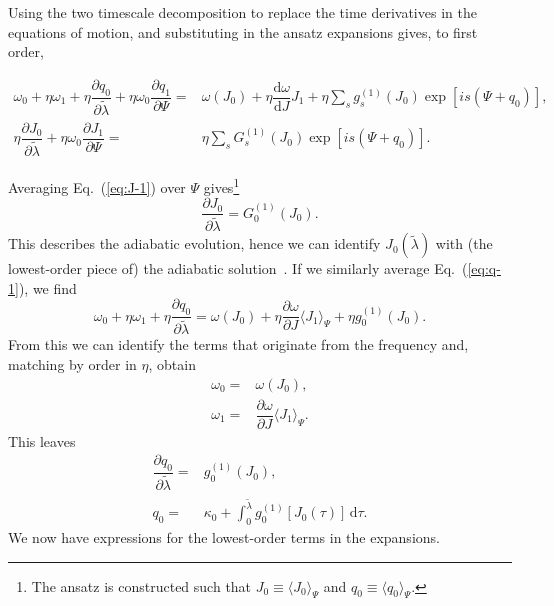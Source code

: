 \documentclass[aps,prd,amsfonts,amssymb,amsmath,nofootinbib,showpacs,superscriptaddress,twocolumn,floatfix]{revtex4-1}
\newcommand{\eqnref}[1]{Eq.~(\ref{eq:#1})}
\newcommand{\dd}{\ensuremath{\mathrm{d}}}
\newcommand{\diff}[2]{\ensuremath{\dfrac{\dd {#1}}{\dd {#2}}}}
\newcommand{\partialdiff}[2]{\ensuremath{\dfrac{\partial {#1}}{\partial {#2}}}}
\newcommand{\intd}[4]{\ensuremath{\int_{#1}^{#2}{#3}\,\dd{#4}}}
\begin{document}
Using the two timescale decomposition to replace the time derivatives in the equations of motion, and substituting in the ansatz expansions gives, to first order,
\begin{widetext}
\begin{subequations}
\begin{align}
\label{eq:q-1}
\omega_0 + \eta\omega_1 + \eta\partialdiff{q_0}{\widetilde{\lambda}} + \eta\omega_0\partialdiff{q_1}{\Psi} = {} & \omega(J_0) + \eta\diff{\omega}{J}J_1 + \eta \sum_s g_s^{(1)}(J_0)\exp\left[is(\Psi + q_0)\right], \\
\eta\partialdiff{J_0}{\widetilde{\lambda}} + \eta\omega_0\partialdiff{J_1}{\Psi} = {} & \eta \sum_s G_s^{(1)}(J_0)\exp\left[is(\Psi + q_0)\right].
\label{eq:J-1}
\end{align}
\end{subequations}
\end{widetext}
Averaging \eqnref{J-1} over $\Psi$ gives\footnote{The ansatz is constructed such that $J_0 \equiv \langle J_0\rangle_\Psi$ and $q_0 \equiv \langle q_0\rangle_\Psi$.}
\begin{equation}
\partialdiff{J_0}{\widetilde{\lambda}} = G_0^{(1)}(J_0).
\label{eq:J-ad}
\end{equation}
This describes the adiabatic evolution, hence we can identify $J_0\left(\widetilde{\lambda}\right)$ with (the lowest-order piece of) the adiabatic solution~\cite{Hinderer2008}. If we similarly average \eqnref{q-1}, we find
\begin{equation}
\omega_0 + \eta\omega_1 +\eta\partialdiff{q_0}{\widetilde{\lambda}} = \omega(J_0) + \eta\partialdiff{\omega}{J}\langle J_1\rangle_\Psi + \eta g_0^{(1)}(J_0).
\end{equation}
From this we can identify the terms that originate from the frequency and, matching by order in $\eta$, obtain
\begin{subequations}
\begin{align}
\omega_0 = {} & \omega(J_0), \\
\omega_1 = {} & \partialdiff{\omega}{J}\langle J_1\rangle_\Psi.
\end{align}
\end{subequations}
This leaves
\begin{align}
\partialdiff{q_0}{\widetilde{\lambda}} = {} & g_0^{(1)}(J_0), \\
q_0 = {} & \kappa_0 + \intd{0}{\tilde{\lambda}}{g_0^{(1)}[J_0(\tau)]}{\tau}.
\label{eq:q-0-sol}
\end{align}
We now have expressions for the lowest-order terms in the expansions.
\end{document}
